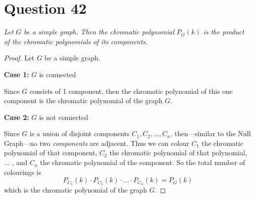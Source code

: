 \documentclass[11pt, oneside]{article}   	%
\begin{document}
\section*{Question 42}

\emph{Let $G$ be a simple graph. Then the chromatic polynomial $P_G(k)$ is the product of the chromatic polynomials of its components.}

\begin{proof}
Let $G$ be a simple graph. 

\textbf{Case 1:} $G$ is connected

Since $G$ consists of 1 component, then the chromatic polynomial of this one component is the chromatic polynomial of the graph $G$.

\textbf{Case 2:} $G$ is not connected

Since $G$ is a union of disjoint components $C_1, C_2, \ldots, C_n$, then---similar to the Null Graph---no two \textit{components} are adjacent. Thus we can colour $C_1$ the chromatic polynomial of that component, $C_2$ the chromatic polynomial of that polynomial, ... , and $C_n$ the chromatic polynomial of the component. So the total number of colourings is
$$P_{C_1}(k) \cdot P_{C_2}(k) \cdot \ldots \cdot P_{C_n}(k) = P_{G}(k)$$
which is the chromatic polynomial of the graph $G$.

\end{proof}
\end{document}

